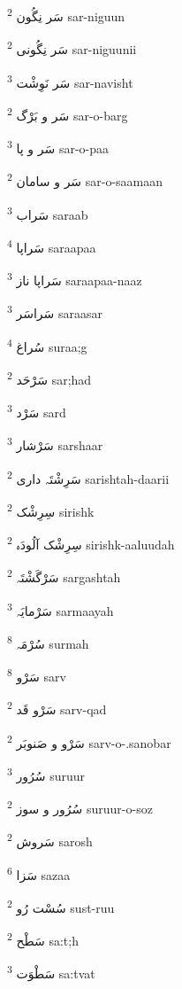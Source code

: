 \documentclass[12pt]{article}
\begin{document}
\begin{RTL}
\begin{multicols}{5}
{\ur سَر نِگُون}   \textsuperscript{2} sar-niguun

{\ur سَر نِگُونی}   \textsuperscript{2} sar-niguunii

{\ur سَر نَوِشْت}   \textsuperscript{3} sar-navisht

{\ur سَر و بَرْگ}   \textsuperscript{2} sar-o-barg

{\ur سَر و پا}   \textsuperscript{3} sar-o-paa

{\ur سَر و سامان}   \textsuperscript{2} sar-o-saamaan

{\ur سَراب}   \textsuperscript{3} saraab

{\ur سَراپا}   \textsuperscript{4} saraapaa

{\ur سَراپا ناز}   \textsuperscript{3} saraapaa-naaz

{\ur سَراسَر}   \textsuperscript{3} saraasar

{\ur سُراغ}   \textsuperscript{4} suraa;g

{\ur سَرْحَد}   \textsuperscript{2} sar;had

{\ur سَرْد}   \textsuperscript{3} sard

{\ur سَرْشار}   \textsuperscript{3} sarshaar

{\ur سَرِشْتَہ داری}   \textsuperscript{2} sarishtah-daarii

{\ur سِرِشْک}   \textsuperscript{2} sirishk

{\ur سِرِشْک آلُودَہ}   \textsuperscript{2} sirishk-aaluudah

{\ur سَرْگَشْتَہ}   \textsuperscript{2} sargashtah

{\ur سَرْمایَہ}   \textsuperscript{3} sarmaayah

{\ur سُرْمَہ}   \textsuperscript{8} surmah

{\ur سَرْو}   \textsuperscript{8} sarv

{\ur سَرْو قَد}   \textsuperscript{2} sarv-qad

{\ur سَرْو و صَنوبَر}   \textsuperscript{2} sarv-o-.sanobar

{\ur سُرُور}   \textsuperscript{3} suruur

{\ur سُرُور و سوز}   \textsuperscript{2} suruur-o-soz

{\ur سَروش}   \textsuperscript{2} sarosh

{\ur سَزا}   \textsuperscript{6} sazaa

{\ur سُسْت رُو}   \textsuperscript{2} sust-ruu

{\ur سَطْح}   \textsuperscript{2} sa:t;h

{\ur سَطْوَت}   \textsuperscript{3} sa:tvat


\end{multicols}
\end{RTL}
\end{document}
